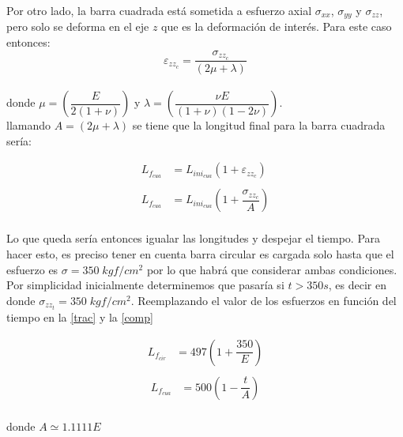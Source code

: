 \documentclass[../notas medios.tex]{subfiles}
\begin{document}
\begin{enumerate}
\begin{itemize}
	Por otro lado, la barra cuadrada está sometida a esfuerzo axial $\sigma_{xx}$, $\sigma_{yy}$ y $\sigma_{zz}$, pero solo se deforma en el eje $z$ que es la deformación de interés. Para este caso entonces: \\
	
	\[\varepsilon _{zz_c} = \dfrac{\sigma_{zz_c} }{(2 \mu + \lambda)}\] \\

donde $\mu =   \left(\dfrac{E }{2(1 + \nu)}\right)$  y $\lambda =   \left(\dfrac{\nu{E} }{(1 + \nu) (1 - 2\nu)}\right)$. \\

	llamando $A = (2 \mu + \lambda)$ se tiene que la longitud final para la barra cuadrada sería: 
	
	\begin{equation}
	\begin{split}
	{L_{f_{cua}}} & = L_{ini_{cua}} (1+  \varepsilon _{zz_c} ) \\\\
	{L_{f_{cua}}} & = L_{ini_{cua}} \left(1+  \dfrac{\sigma_{zz_c} }{A}\right) \\
	\end{split}
	\label{comp}
	\end{equation}
	
Lo que queda sería entonces igualar las longitudes y despejar el tiempo. Para hacer esto, es preciso tener en cuenta barra circular es cargada solo hasta que el esfuerzo es $\sigma=350  \; kgf/cm^2$ por lo que habrá que considerar ambas condiciones. Por simplicidad inicialmente determinemos que pasaría si $t > 350 s$, es decir en donde $\sigma_{zz_t} = 350  \; kgf/cm^2$. Reemplazando el valor de los esfuerzos en función del tiempo en la \cref {trac} y la  \cref{comp}

	\begin{equation}
	\begin{split}
	{L_{f_{cir}}} & = 497 \left(1+  \dfrac{350 }{E}\right) \\
	\end{split}
	\label{trac2}
	\end{equation}	
		\begin{equation}
	\begin{split}
	{L_{f_{cua}}} & = 500 \left(1- \dfrac{t }{A}\right) \\
	\end{split}
	\label{comp2}
	\end{equation}

donde $A \simeq 1.1111E$ \\


\end{itemize}
\end{enumerate}
\end{document}
